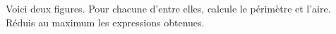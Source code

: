 %
%
Voici deux figures. Pour chacune d'entre elles, calcule le périmètre et l'aire. Réduis au maximum les expressions obtenues.\\
